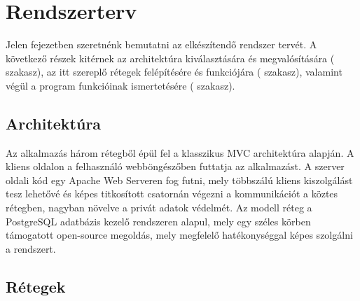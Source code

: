 \chapter{Rendszerterv}\label{sect:rszterv}

Jelen fejezetben szeretnénk bemutatni az elkészítendő rendszer tervét. A következő részek kitérnek az architektúra kiválasztására és megvalósítására ( szakasz), az itt szereplő rétegek felépítésére és funkciójára ( szakasz), valamint végül a program funkcióinak ismertetésére ( szakasz).

\section{Architektúra}\label{sect:architektura}


Az alkalmazás három rétegből épül fel a klasszikus MVC architektúra alapján. A kliens oldalon a felhasználó webböngészőben futtatja az alkalmazást. A szerver oldali kód egy Apache Web Serveren fog futni, mely többszálú kliens kiszolgálást tesz lehetővé és képes titkosított csatornán végezni a kommunikációt a köztes rétegben, nagyban növelve a privát adatok védelmét. Az modell réteg a PostgreSQL adatbázis kezelő rendszeren alapul, mely egy széles körben támogatott open-source megoldás, mely megfelelő hatékonységgal képes szolgálni a rendszert. 


\section{Rétegek}\label{sect:retegek}

